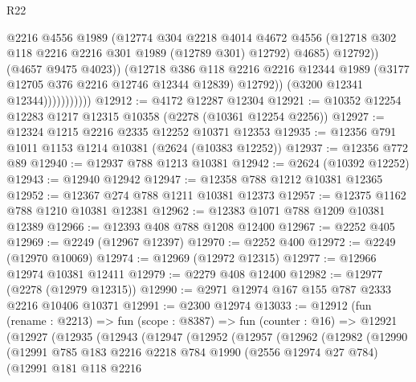 \begin{lexlean}{R22}
\begin{coremodule}
                                @2216
                                @4556
                                @1989
                                (@12774
                                  @304
                                  @2218
                                  @4014
                                  @4672
                                  @4556
                                  (@12718 @302 @118 @2216 @2216 @301 @1989 (@12789 @301) @12792)
                                  @4685)
                                @12792))
                            (@4657 @9475 @4023))
                          (@12718
                            @386
                            @118
                            @2216
                            @2216
                            @12344
                            @1989
                            (@3177 @12705 @376 @2216 @12746 @12344 @12839)
                            @12792))
                        (@3200 @12341 @12344)))))))))))
@12912 := @4172 @12287 @12304
@12921 := @10352 @12254 @12283 @1217 @12315 @10358 (@2278 (@10361 @12254 @2256))
@12927 := @12324 @1215 @2216 @2335 @12252 @10371 @12353
@12935 := @12356 @791 @1011 @1153 @1214 @10381 (@2624 (@10383 @12252))
@12937 := @12356 @772 @89
@12940 := @12937 @788 @1213 @10381
@12942 := @2624 (@10392 @12252)
@12943 := @12940 @12942
@12947 := @12358 @788 @1212 @10381 @12365
@12952 := @12367 @274 @788 @1211 @10381 @12373
@12957 := @12375 @1162 @788 @1210 @10381 @12381
@12962 := @12383 @1071 @788 @1209 @10381 @12389
@12966 := @12393 @408 @788 @1208 @12400
@12967 := @2252 @405
@12969 := @2249 (@12967 @12397)
@12970 := @2252 @400
@12972 := @2249 (@12970 @10069)
@12974 := @12969 (@12972 @12315)
@12977 := @12966 @12974 @10381 @12411
@12979 := @2279 @408 @12400
@12982 := @12977 (@2278 (@12979 @12315))
@12990 := @2971 @12974 @167 @155 @787 @2333 @2216 @10406 @10371
@12991 := @2300 @12974
@13033 := @12912
    (fun (rename : @2213) =>
    fun (scope : @8387) =>
    fun (counter : @16) =>
    @12921
      (@12927
        (@12935
          (@12943
            (@12947
              (@12952
                (@12957
                  (@12962
                    (@12982
                      (@12990
                        (@12991
                          @785
                          @183
                          @2216
                          @2218
                          @784
                          @1990
                          (@2556 @12974 @27 @784)
                          (@12991
                            @181
                            @118
                            @2216

\end{coremodule}
\end{lexlean}
